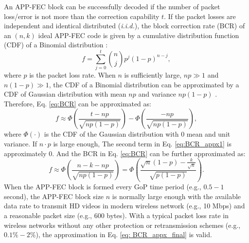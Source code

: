\documentclass[journal]{IEEEtran}
\begin{document}
An APP-FEC block can be successfully decoded if the number of packet loss/error is not more than the correction capability $t$. If the packet losses are independent and identical distributed (\textit{i.i.d.}), the block correction rate (BCR) of an $\left(n,k\right)$ ideal APP-FEC code is given by a cumulative distribution function (CDF) of a Binomial distribution \cite{HHWL12}:
\begin{equation} \label{eq:BCR}
f=\sum_{j=0}^{t}\binom{n}{j}p^j\left(1-p\right)^{n-j},
\end{equation}
where $p$ is the packet loss rate. When $n$ is sufficiently large, $np\gg1$ and $n\left(1-p\right)\gg1$, the CDF of a Binomial distribution can be approximated by a CDF of Gaussian distribution with mean $np$ and variance $np\left(1-p\right)$ \cite{StWo11}. Therefore, Eq. \eqref{eq:BCR} can be approximated as:
\begin{equation} \label{eq:BCR_appx1}
f\approx \Phi\left(\frac{t-np}{\sqrt{np\left(1-p\right)}}\right)-\Phi\left(\frac{-np}{\sqrt{np\left(1-p\right)}}\right),
\end{equation}
where $\Phi\left(\cdot\right)$ is the CDF of the Gaussian distribution with $0$ mean and unit variance. If $n\cdot p$ is large enough, The second term in Eq. \eqref{eq:BCR_appx1} is approximately $0$. And the BCR in Eq. \eqref{eq:BCR} can be further approximated as:
\begin{equation}\label{eq: BCR_appx_final}
f\approx \Phi\left(\frac{n-k-np}{\sqrt{np\left(1-p\right)}}\right)=\Phi\left(\frac{\sqrt{n}\left(1-p\right)-\frac{k}{\sqrt{n}}}{\sqrt{p\left(1-p\right)}}\right).
\end{equation}
When the APP-FEC block is formed every GoP time period (e.g., $0.5 - 1$ second), the APP-FEC block size $n$ is normally large enough with the available data rate to transmit HD videos in modern wireless network (e.g., 10 Mbps) and a reasonable packet size (e.g., $600$ bytes). With a typical packet loss rate in wireless networks without any other protection or retransmission schemes (e.g., $0.1 \% - 2 \%$), the approximation in Eq. \eqref{eq: BCR_appx_final} is valid.
\end{document}
